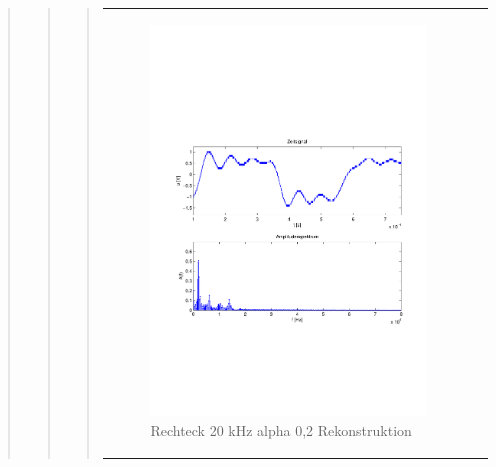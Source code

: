 \begin{quote}
\begin{quote}
\begin{quote}
\begin{center}
\begin{tabular}{ll}
            \hspace{-5cm}
                \begin{minipage}{0.6\textwidth}
                    \begin{figure}[H]
                        \includegraphics[scale=0.55, trim = 16mm 70mm 16mm 85mm, clip]{Bilder/flatrec20_02}
                          \caption{Rechteck 20 kHz alpha 0,2 Rekonstruktion}
		                  \label{fig:flatrec20_02}
                    \end{figure}
                \end{minipage}
                

\end{tabular}
\end{center}
\end{quote}
\end{quote}
\end{quote}
